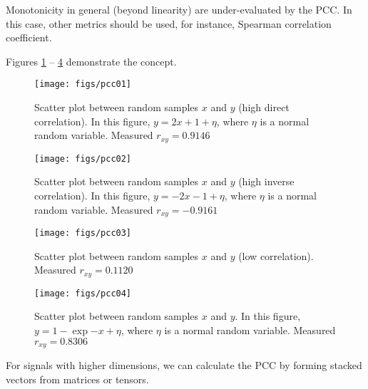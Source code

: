 Monotonicity in general (beyond linearity) are under-evaluated by the PCC. In this case, other metrics should be used, for instance, Spearman correlation coefficient. 

Figures \ref{fig:pcc01} -- \ref{fig:pcc04} demonstrate the concept.
\begin{figure}
	\texttt{[image: figs/pcc01]}
	\caption{Scatter plot between random samples $x$ and $y$ (high direct correlation). In this figure, $y = 2x+1+\eta$, where $\eta$ is a normal random variable. Measured $r_{xy}=0.9146$}
	\label{fig:pcc01}
\end{figure}

\begin{figure}
	\texttt{[image: figs/pcc02]}
	\caption{Scatter plot between random samples $x$ and $y$ (high inverse correlation). In this figure, $y = -2x-1+\eta$, where $\eta$ is a normal random variable. Measured $r_{xy}=-0.9161$}
	\label{fig:pcc02}
\end{figure}

\begin{figure}
	\texttt{[image: figs/pcc03]}
	\caption{Scatter plot between random samples $x$ and $y$ (low correlation). Measured $r_{xy}=0.1120$}
	\label{fig:pcc03}
\end{figure}

\begin{figure}
	\texttt{[image: figs/pcc04]}
	\caption{Scatter plot between random samples $x$ and $y$. In this figure, $y = 1-\exp{-x}+\eta$, where $\eta$ is a normal random variable. Measured $r_{xy}=0.8306$}
	\label{fig:pcc04}
\end{figure}

For signals with higher dimensions, we can calculate the PCC by forming stacked vectors from matrices or tensors.

%
%
